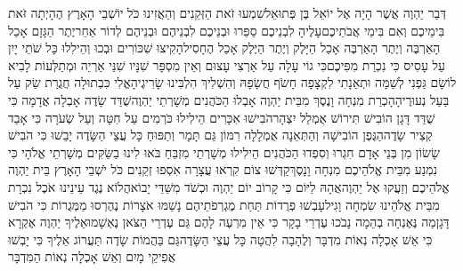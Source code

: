 \documentclass[../main/main.tex]{subfiles}
\begin{document}
\begin{multicols*}{\ncols}
דְּבַר יַהְוֶה אֲשֶׁר הָיָה אֶל יוֹאֵל בֶּן פְּתוּאֵל\PreVerseSpace{}שִׁמְעוּ זֹאת הַזְּקֵנִים וְהַאֲזִינוּ כֹּל יוֹשְׁבֵי הָאָרֶץ הֶהָיְתָה זֹּאת בִּימֵיכֶם וְאִם בִּימֵי אֲבֹתֵיכֶם\PreVerseSpace{}עָלֶיהָ לִבְנֵיכֶם סַפֵּרוּ וּבְנֵיכֶם לִבְנֵיהֶם וּבְנֵיהֶם לְדוֹר אַחֵר\PreVerseSpace{}יֶתֶר הַגָּזָם אָכַל הָאַרְבֶּה וְיֶתֶר הָאַרְבֶּה אָכַל הַיָּלֶק וְיֶתֶר הַיֶּלֶק אָכַל הֶחָסִיל\PreVerseSpace{}הָקִיצוּ שִׁכּוֹרִים וּבְכוּ וְהֵילִלוּ כָּל שֹׁתֵי יָיִן עַל עָסִיס כִּי נִכְרַת מִפִּיכֶם\PreVerseSpace{}כִּי גוֹי עָלָה עַל אַרְצִי עָצוּם וְאֵין מִסְפָּר שִׁנָּיו שִׁנֵּי אַרְיֵה וּמְתַלְּעוֹת לָבִיא לוֹ\PreVerseSpace{}שָׂם גַּפְנִי לְשַׁמָּה וּתְאֵנָתִי לִקְצָפָה חָשֹׂף חֲשָׂפָהּ וְהִשְׁלִיךְ הִלְבִּינוּ שָׂרִיגֶיהָ\PreVerseSpace{}אֱלִי כִּבְתוּלָה חֲגֻרַת שַׂק עַל בַּעַל נְעוּרֶיהָ\PreVerseSpace{}הָכְרַת מִנְחָה וָנֶסֶךְ מִבֵּית יַהְוֶה אָבְלוּ הַכֹּהֲנִים מְשָׁרְתֵי יַהְוֶה\PreVerseSpace{}שֻׁדַּד שָׂדֶה אָבְלָה אֲדָמָה כִּי שֻׁדַּד דָּגָן הוֹבִישׁ תִּירוֹשׁ אֻמְלַל יִצְהָר\PreVerseSpace{}הֹבִישׁוּ אִכָּרִים הֵילִילוּ כֹּרְמִים עַל חִטָּה וְעַל שְׂעֹרָה כִּי אָבַד קְצִיר שָׂדֶה\PreVerseSpace{}הַגֶּפֶן הוֹבִישָׁה וְהַתְּאֵנָה אֻמְלָלָה רִמּוֹן גַּם תָּמָר וְתַפּוּחַ כָּל עֲצֵי הַשָּׂדֶה יָבֵשׁוּ כִּי הֹבִישׁ שָׂשׂוֹן מִן בְּנֵי אָדָם \ClosedSection{}חִגְרוּ וְסִפְדוּ הַכֹּהֲנִים הֵילִילוּ מְשָׁרְתֵי מִזְבֵּחַ בֹּאוּ לִינוּ בַשַּׂקִּים מְשָׁרְתֵי אֱלֹהָי כִּי נִמְנַע מִבֵּית אֱלֹהֵיכֶם מִנְחָה וָנָסֶךְ\PreVerseSpace{}קַדְּשׁוּ צוֹם קִרְאוּ עֲצָרָה אִסְפוּ זְקֵנִים כֹּל יֹשְׁבֵי הָאָרֶץ בֵּית יַהְוֶה אֱלֹהֵיכֶם וְזַעֲקוּ אֶל יַהְוֶה\PreVerseSpace{}אֲהָהּ לַיּוֹם כִּי קָרוֹב יוֹם יַהְוֶה וּכְשֹׁד מִשַּׁדַּי יָבוֹא\PreVerseSpace{}הֲלוֹא נֶגֶד עֵינֵינוּ אֹכֶל נִכְרָת מִבֵּית אֱלֹהֵינוּ שִׂמְחָה וָגִיל\PreVerseSpace{}עָבְשׁוּ פְרֻדוֹת תַּחַת מֶגְרְפֹתֵיהֶם נָשַׁמּוּ אֹצָרוֹת נֶהֶרְסוּ מַמְּגֻרוֹת כִּי הֹבִישׁ דָּגָן\PreVerseSpace{}מַה נֶּאֶנְחָה בְהֵמָה נָבֹכוּ עֶדְרֵי בָקָר כִּי אֵין מִרְעֶה לָהֶם גַּם עֶדְרֵי הַצֹּאן נֶאְשָׁמוּ\PreVerseSpace{}אֵלֶיךָ יַהְוֶה אֶקְרָא כִּי אֵשׁ אָכְלָה נְאוֹת מִדְבָּר וְלֶהָבָה לִהֲטָה כָּל עֲצֵי הַשָּׂדֶה\PreVerseSpace{}גַּם בַּהֲמוֹת שָׂדֶה תַּעֲרוֹג אֵלֶיךָ כִּי יָבְשׁוּ אֲפִיקֵי מָיִם וְאֵשׁ אָכְלָה נְאוֹת הַמִּדְבָּר\OpenSection{}\par

\end{multicols*}
\end{document}
